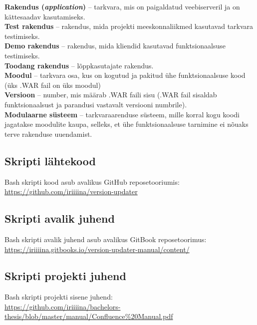 \documentclass[12pt]{report}
\begin{document}
  \textbf{Rakendus (\textit{application})} \--- tarkvara, mis on paigaldatud veebiserveril ja on kättesaadav kasutamiseks.\\
  
  \textbf{Test rakendus} \--- rakendus, mida projekti meeskonnaliikmed kasutavad tarkvara testimiseks.\\
  
  \textbf{Demo rakendus} \--- rakendus, mida kliendid kasutavad funktsionaalsuse testimiseks.\\
  
  \textbf{Toodang rakendus} \--- lõppkasutajate rakendus.\\
  
  \textbf{Moodul} \--- tarkvara osa, kus on kogutud ja pakitud ühe funktsionaalsuse kood (üks .WAR fail on üks moodul)\\
  
  \textbf{Versioon} \--- number, mis määrab .WAR faili sisu (.WAR fail sisaldab funktsionaalsust ja parandusi vastavalt versiooni numbrile).\\
  
  \textbf{Modulaarne süsteem} \--- tarkvaraarenduse süsteem, mille korral kogu koodi jagatakse moodulite kaupa, selleks, et ühe funktsionaalsuse tarnimine ei nõuaks terve rakenduse uuendamist.\\
  
  \subsection*{Skripti lähtekood}
  
  Bash skripti kood asub avalikus GitHub reposetooriumis:\\
  \url{https://github.com/iriiiina/version-updater}
  
  \subsection*{Skripti avalik juhend}
  
  Bash skripti avalik juhend asub avalikus GitBook reposetoorimus:\\
  \url{https://iriiiina.gitbooks.io/version-updater-manual/content/}
  
  \subsection*{Skripti projekti juhend}
  
  Bash skripti projekti sisene juhend:\\
  \url{https://github.com/iriiiina/bachelors-thesis/blob/master/manual/Confluence%20Manual.pdf}
  
\end{document}
